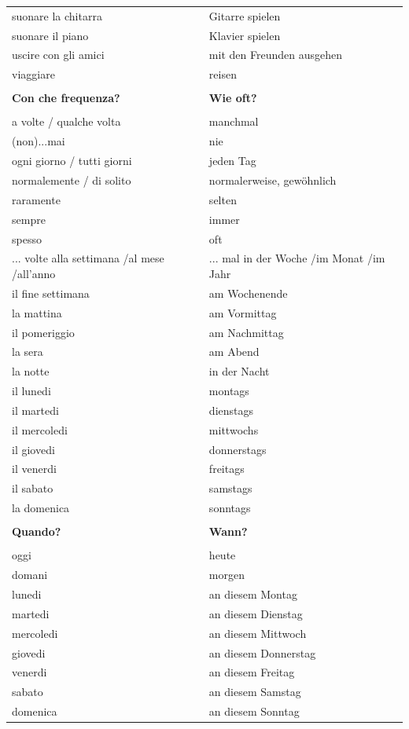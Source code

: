\documentclass[10pt]{scrartcl}
\begin{document}
\begin{multicols*}{2}
\begin{supertabular}{p{4cm}p{4cm}}
suonare la chitarra & Gitarre spielen\\
suonare il piano & Klavier spielen\\
uscire con gli amici & mit den Freunden ausgehen\\
viaggiare & reisen\\
\\
\textbf{Con che frequenza?} & \textbf{Wie oft?}\\
\\
a volte / qualche volta & manchmal\\
(non)...mai & nie\\
ogni giorno / tutti giorni & jeden Tag\\
normalemente / di solito & normalerweise, gewöhnlich\\
raramente & selten\\
sempre & immer\\
spesso & oft\\
... volte alla settimana /al mese /all'anno & ... mal in der Woche /im Monat /im Jahr\\
il fine settimana & am Wochenende \\
la mattina & am Vormittag\\
il pomeriggio & am Nachmittag\\
la sera & am Abend\\
la notte & in der Nacht\\
il lunedi & montags\\
il martedi & dienstags\\
il mercoledi & mittwochs\\
il giovedi & donnerstags\\
il venerdi & freitags\\
il sabato & samstags\\
la domenica & sonntags\\
\\
\textbf{Quando?} & \textbf{Wann?}\\
\\
oggi & heute\\
domani & morgen\\
lunedi & an diesem Montag \\
martedi & an diesem Dienstag\\
mercoledi & an diesem Mittwoch\\
giovedi & an diesem Donnerstag\\
venerdi & an diesem Freitag\\
sabato & an diesem Samstag\\
domenica & an diesem Sonntag\\

\end{supertabular}
\end{multicols*}
\end{document}
